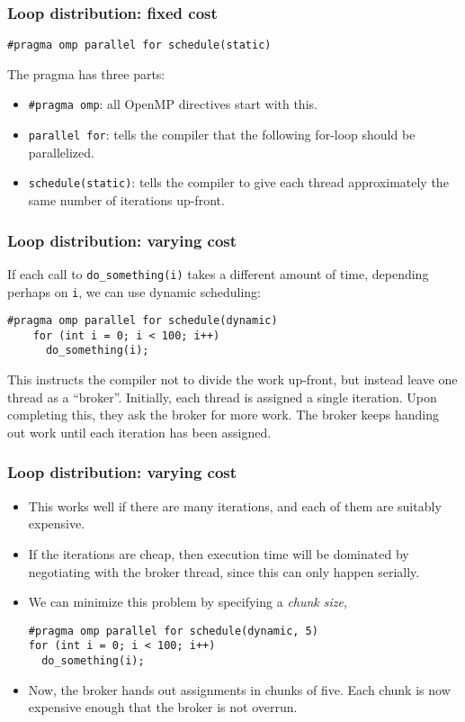 \begin{frame}[fragile]
  \frametitle{Loop distribution: fixed cost}
  \begin{lstlisting}[style=c]
    #pragma omp parallel for schedule(static)
  \end{lstlisting}
  The pragma has three parts:
  \begin{itemize}
  \item \texttt{\#pragma omp}: all OpenMP directives start with this.
  \item \texttt{parallel for}: tells the compiler that the following for-loop
    should be parallelized.
  \item \texttt{schedule(static)}: tells the compiler to give each thread
    approximately the same number of iterations up-front.
  \end{itemize}
\end{frame}

\begin{frame}[fragile]
  \frametitle{Loop distribution: varying cost}
  If each call to \texttt{do\_something(i)} takes a different amount of time,
  depending perhaps on \texttt{i}, we can use dynamic scheduling:
  \begin{lstlisting}[style=c]
    #pragma omp parallel for schedule(dynamic)
    for (int i = 0; i < 100; i++)
      do_something(i);
  \end{lstlisting}
  This instructs the compiler not to divide the work up-front, but instead leave
  one thread as a ``broker''. Initially, each thread is assigned a single
  iteration. Upon completing this, they ask the broker for more work. The broker
  keeps handing out work until each iteration has been assigned.
\end{frame}

\begin{frame}[fragile]
  \frametitle{Loop distribution: varying cost}
  \begin{itemize}
  \item This works well if there are many iterations, and each of them are
    suitably expensive.
  \item If the iterations are cheap, then execution time will be dominated by
    negotiating with the broker thread, since this can only happen serially.
  \item We can minimize this problem by specifying a \emph{chunk size},
  \begin{lstlisting}[style=c]
#pragma omp parallel for schedule(dynamic, 5)
for (int i = 0; i < 100; i++)
  do_something(i);
  \end{lstlisting}
  \item Now, the broker hands out assignments in chunks of five. Each chunk is
    now expensive enough that the broker is not overrun.
  \end{itemize}
\end{frame}

